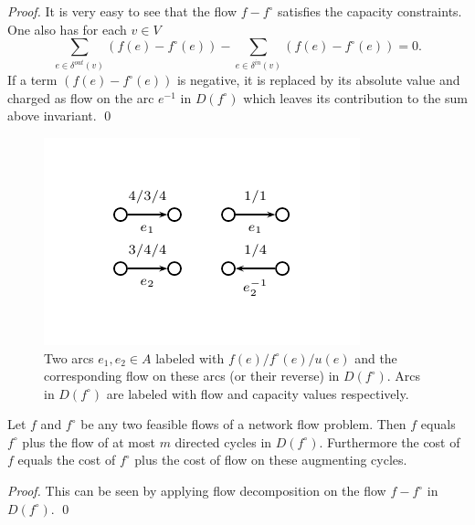   


  \begin{proof}
    It is very easy to see that the flow $f - f^\circ$ satisfies the
    capacity constraints. One also has for each $v \in V$
    \begin{displaymath}
      \sum_{e \in \delta^{out}(v)} (f (e) - f^\circ(e))  - \sum_{e \in \delta^{in}(v)}
      (f (e) - f^\circ(e)) = 0.
    \end{displaymath}
    If a term $(f (e) - f^\circ(e))$ is negative, it is replaced by its
    absolute value and charged as flow on the arc $e^{-1}$ in
    $D(f^\circ)$ which leaves its contribution to the sum above
    invariant. 
    \qed     
  \end{proof}




  \begin{figure}
  \centering
 \includegraphics{figures/flows4.pdf}
\caption{Two  arcs $e_1,e_2 \in A$ labeled with $f(e)/f^\circ(e)/u(e)$ and the
  corresponding flow on these arcs (or their reverse) in
  $D(f^\circ)$. Arcs in $D(f^\circ)$ are labeled with flow and capacity
  values respectively. }\label{fig:diff}
\end{figure}


  \begin{theorem}
    \label{f:thr:augcyc}
    Let $f$ and $f^\circ$ be any two feasible flows of a network flow
    problem. Then $f$ equals $f^\circ$ plus the flow of at most $m$
    directed cycles in $D(f^\circ)$.  Furthermore the cost of $f$ equals
    the cost of $f^\circ$ plus the cost of flow on these augmenting
    cycles. 
  \end{theorem}
  
  \begin{proof}
    This can be seen by applying flow decomposition on the  flow 
    $f - f^\circ$  in $D(f^\circ)$. \qed
  \end{proof}
  

